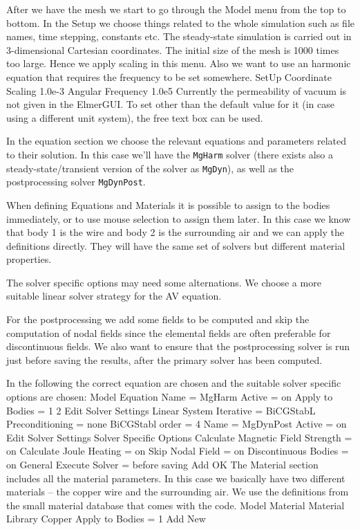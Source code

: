 After we have the mesh we start to go through the Model menu from the top to bottom. 
In the Setup we choose things related to the whole simulation such as file names, 
time stepping, constants etc.
The steady-state simulation is carried out in 3-dimensional Cartesian
coordinates. The initial size of the mesh is 1000 times too large. Hence we apply scaling in this menu.
Also we want to use an harmonic equation that requires the frequency to be set somewhere. 
\ttbegin
SetUp
  Coordinate Scaling 
    1.0e-3
  Angular Frequency
    1.0e5   
\ttend
Currently the permeability of vacuum is not given
in the ElmerGUI. To set other than the default value for it (in case using a different unit system),
the free text box can be used.

In the equation section we choose the relevant equations and parameters related to their solution. 
In this case we'll have the \texttt{MgHarm} solver (there exists also a steady-state/transient version of the solver
as \texttt{MgDyn}), as well as the postprocessing solver \texttt{MgDynPost}.

When defining Equations and Materials it is possible to assign to the bodies immediately, or to use mouse
selection to assign them later. In this case we know that body 1 is the wire and body 2 is the surrounding air and we
can apply the definitions directly.
They will have the same set of solvers but different material properties. 

The solver specific options may need some alternations. We choose a more suitable
linear solver strategy for the AV equation. 

For the postprocessing we add some fields to be computed and skip the computation of nodal fields since the
elemental fields are often preferable for discontinuous fields. 
We also want to ensure that the postprocessing solver is run just before saving the results, after the primary solver has been computed.

In the following the correct equation are chosen and the suitable solver specific options are chosen:
\ttbegin
Model
  Equation
    Name = MgHarm
      Active = on
      Apply to Bodies = 1 2  
      Edit Solver Settings
        Linear System
          Iterative = BiCGStabL
        Preconditioning = none
        BiCGStabl order = 4    
    Name = MgDynPost
      Active = on
      Edit Solver Settings
        Solver Specific Options
          Calculate Magnetic Field Strength = on
          Calculate Joule Heating = on
          Skip Nodal Field = on
          Discontinuous Bodies = on
        General
          Execute Solver = before saving   
    Add 
    OK
\ttend        
The Material section includes all the material parameters. In this case we basically have two 
different materials -- the copper wire and the surrounding air.
We use the definitions from the small material database that comes with the code.
\ttbegin
Model
  Material
    Material Library
      Copper
    Apply to Bodies = 1
    Add
    New

